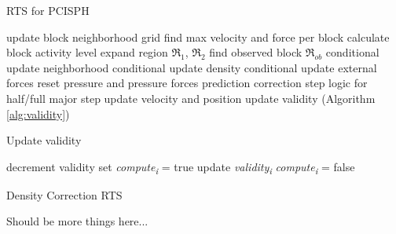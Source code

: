 \documentclass[../../main.tex]{subfiles}
\begin{document}
\begin{algorithm}[]
    \caption{RTS for PCISPH}
    \label{alg:rts:pcisph}
    \begin{algorithmic}[1]
            \State update block neighborhood grid
            \State find max velocity and force per block
            \State calculate block activity level
            \State expand region $\Re_1$, $\Re_2$
            \State find observed block $\Re_{ob}$
                \State conditional update neighborhood
                \State conditional update density 
                \State conditional update external forces 
                \State reset pressure and pressure forces
                \State prediction correction step
                \State logic for half/full major step
                \State update velocity and position
                \State update validity (Algorithm \ref{alg:validity})
            \EndFor
        \EndWhile
   \end{algorithmic}
\end{algorithm}

 
\begin{algorithm}[h]
    \caption{Update validity}
    \label{alg:validity}
    \begin{algorithmic}[1]
            \State decrement validity
                \State set \textit{{\texorpdfstring{compute\textsubscript{i}}{compute i}}} = true
                \State update \textit{{\texorpdfstring{validity\textsubscript{i}}{validity i}}}
            \Else
                \State \textit{{\texorpdfstring{compute\textsubscript{i}}{compute i}}} = false
            \EndIf
        \EndFor
   \end{algorithmic}
\end{algorithm}


\begin{algorithm}[h]
    \caption{Density Correction RTS}
    \label{alg:rts:correction}
    \begin{algorithmic}[1]
       \State Should be more things here...
   \end{algorithmic}
\end{algorithm}
\end{document}
